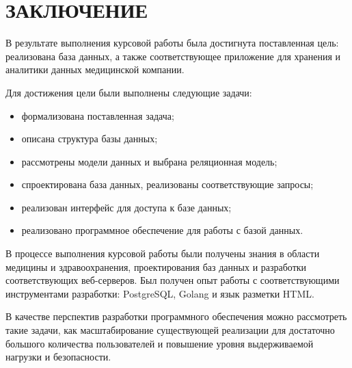 \chapter*{ЗАКЛЮЧЕНИЕ}

В результате выполнения курсовой работы была достигнута поставленная цель: реализована база данных, а также соответствующее приложение для хранения и аналитики данных медицинской компании.

Для достижения цели были выполнены следующие задачи:

\begin{itemize}
	\item формализована поставленная задача;
	\item описана структура базы данных;
	\item рассмотрены модели данных и выбрана реляционная модель;
	\item спроектирована база данных, реализованы соответствующие запросы;
	\item реализован интерфейс для доступа к базе данных;
	\item реализовано программное обеспечение для работы с базой данных.
\end{itemize}

В процессе выполнения курсовой работы были получены знания в области медицины и здравоохранения, проектирования баз данных и разработки соответствующих веб-серверов. Был получен опыт работы с соответствующими инструментами разработки: PostgreSQL, Golang и язык разметки HTML.

В качестве перспектив разработки программного обеспечения можно рассмотреть такие задачи, как масштабирование существующей реализации для достаточно большого количества пользователей и повышение уровня выдерживаемой нагрузки и безопасности.